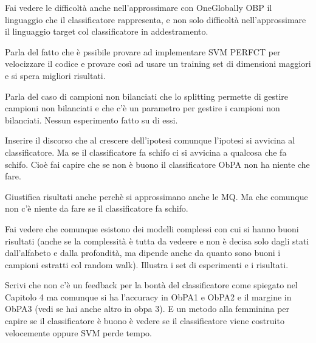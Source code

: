 Fai vedere le difficoltà anche nell'approssimare con OneGlobally OBP il linguaggio che il classificatore rappresenta, e non solo difficoltà nell'approssimare il linguaggio target col classificatore in addestramento.

Parla del fatto che è pssibile provare ad implementare SVM PERFCT per velocizzare il codice e provare così ad usare un training set di dimensioni maggiori e si spera migliori risultati.

Parla del caso di campioni non bilanciati che lo splitting permette di gestire campioni non bilanciati e che c'è un parametro per gestire i campioni non bilanciati. Nessun esperimento fatto su di essi.

Inserire il discorso che al crescere dell'ipotesi comunque l'ipotesi si avvicina al classificatore. Ma se il classificatore fa schifo ci si avvicina a qualcosa che fa schifo. Cioè fai capire che se non è buono il classificatore ObPA non ha niente che fare.

Giustifica risultati anche perchè si approssimano anche le MQ. Ma che comunque non c'è niente da fare se il classificatore fa schifo.



Fai vedere che comunque esistono dei modelli complessi con cui si hanno buoni risultati (anche se la complessità è tutta da vedeere e non è decisa solo dagli stati dall'alfabeto e dalla profondità, ma dipende anche da quanto sono buoni i campioni estratti col random walk).
Illustra i set di esperimenti e i risultati.

Scrivi che non c'è un feedback per la bontà del classificatore come spiegato nel Capitolo 4 ma comunque si ha l'accuracy in ObPA1 e ObPA2 e il margine in ObPA3 (vedi se hai anche altro in obpa 3). E un metodo alla femminina per capire se il classificatore è buono è vedere se il classificatore viene costruito velocemente oppure SVM perde tempo. 